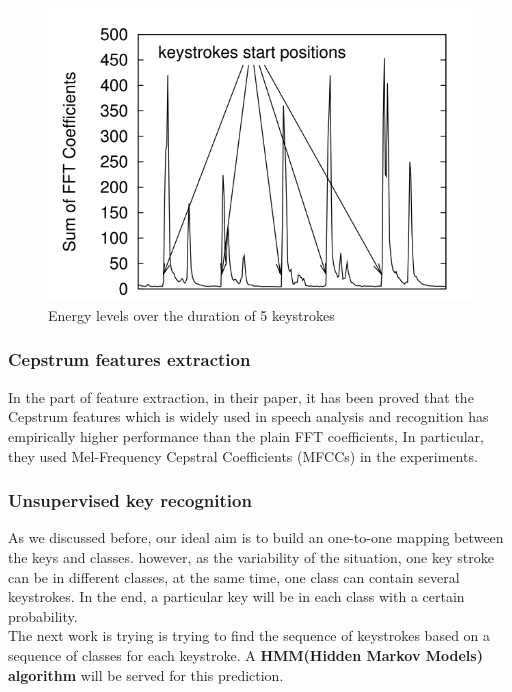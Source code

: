 \documentclass[12pt,a4paper]{article}
\begin{document}
\begin{figure}[h]
\begin{center}
        \includegraphics[scale=0.45]{energyLevel.png}
        \caption{Energy levels over the duration of 5 keystrokes}
        \label{fig:2}
\end{center}
\end{figure} \par
\FloatBarrier

\subsubsection{Cepstrum features extraction}
In the part of feature extraction, in their paper, it has been proved that the Cepstrum features which is widely used in speech analysis and recognition has empirically higher performance than the plain FFT coefficients, In particular, they used Mel-Frequency Cepstral Coefficients (MFCCs) in the experiments.

\subsubsection{Unsupervised key recognition}

As we discussed before, our ideal aim is to build an one-to-one mapping between the keys and classes. however, as the variability of the situation, one key stroke can be in different classes, at the same time, one class can contain several keystrokes. In the end, a particular key will be in each class with a certain probability.\\

The next work is trying is trying to find the sequence of keystrokes based on a sequence of classes for each keystroke. A \textbf{HMM(Hidden Markov Models) algorithm} will be served for this prediction.\\
\end{document}
